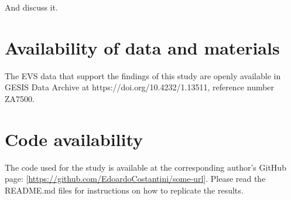 \documentclass[a4paper,doc,floatsintext,natbib]{apa6}\usepackage[]{graphicx}\usepackage[]{xcolor}
\newcommand{\pathBIB}{./bib}
\begin{document}
	And discuss it.
    
    \setcounter{secnumdepth}{4}

    \section{Availability of data and materials}

    The EVS data that support the findings of this study are openly available in GESIS Data Archive at https://doi.org/10.4232/1.13511, reference number ZA7500.
    
    \section{Code availability}

    The code used for the study is available at the corresponding author's GitHub page: [\url{https://github.com/EdoardoCostantini/some-url}].
    Please read the README.md files for instructions on how to replicate the results.

    



\end{document}
